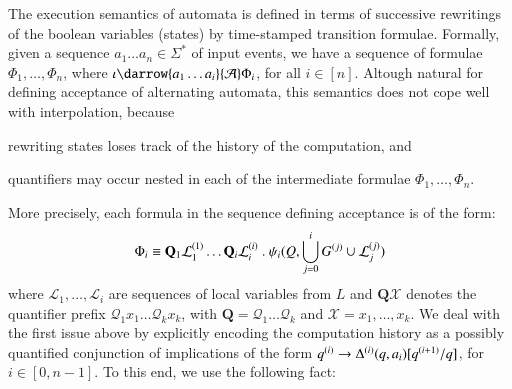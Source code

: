 \documentclass{llncs}
\begin{document}
The execution semantics of automata is defined in terms of successive
rewritings of the boolean variables (states) by time-stamped
transition formulae. Formally, given a sequence $a_1 \ldots a_n \in
\Sigma^*$ of input events, we have a sequence of formulae $\Phi_1,
\ldots, \Phi_n$, where $\iota \darrow{a_1 \ldots a_i}{\A} \Phi_i$, for
all $i \in [n]$. Altough natural for defining acceptance of
alternating automata, this semantics does not cope well with
interpolation, because\begin{inparaenum}[(1)]
\item rewriting states loses track of the history of the computation,
  and
%
\item quantifiers may occur nested in each of the intermediate
  formulae $\Phi_1,\ldots,\Phi_n$.
\end{inparaenum}

More precisely, each formula in the sequence defining acceptance is of
the form: \[\Phi_i \equiv \mathbf{Q}_1 {\mathcal{L}}^{({1})}_1 \ldots
\mathbf{Q}_i {\mathcal{L}}^{({i})}_i ~.~ \psi_i(Q,\bigcup_{j=0}^i
{G}^{({j})} \cup {\mathcal{L}}^{({j})}_j)\] where $\mathcal{L}_1,
\ldots, \mathcal{L}_i$ are sequences of local variables from $L$ and
$\mathbf{Q} \mathcal{X}$ denotes the quantifier prefix $\mathcal{Q}_1
x_1 \ldots \mathcal{Q}_k x_k$, with $\mathbf{Q} = \mathcal{Q}_1 \ldots
\mathcal{Q}_k$ and $\mathcal{X} = x_1,\ldots,x_k$. We deal with the
first issue above by explicitly encoding the computation history as a
possibly quantified conjunction of implications of the form
${q}^{({i})} \rightarrow {\Delta}^{({i})}(q,a_i)[{q}^{({i+1})}/q]$,
for $i \in [0,n-1]$. To this end, we use the following fact:
\end{document}
